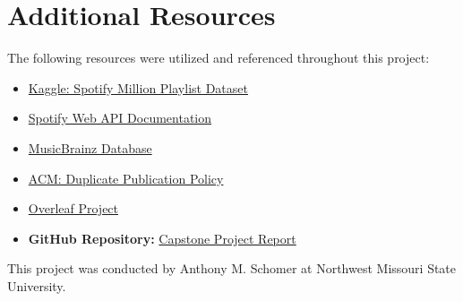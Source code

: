 \documentclass[runningheads]{llncs}
\begin{document}
\section{Additional Resources}
The following resources were utilized and referenced throughout this project:

\begin{itemize}
    \item \href{https://www.kaggle.com/datasets/shubhendra/million-playlist-dataset}{Kaggle: Spotify Million Playlist Dataset}
    \item \href{https://developer.spotify.com/documentation/web-api/}{Spotify Web API Documentation}
    \item \href{https://musicbrainz.org/}{MusicBrainz Database}
    \item \href{https://www.acm.org/publications/policies/duplicate-publication}{ACM: Duplicate Publication Policy}
    \item \href{https://www.overleaf.com/project}{Overleaf Project}
    \item \textbf{GitHub Repository:} \href{https://github.com/anythonyschomer/Capstone-Project-Report}{Capstone Project Report}
\end{itemize}

\vspace{1em}
This project was conducted by Anthony M. Schomer at Northwest Missouri State University.
\end{document}
